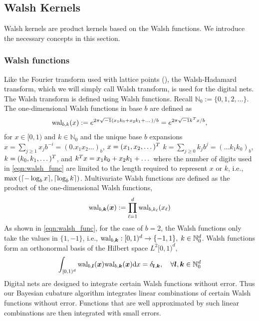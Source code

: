 \documentclass{svjour3}                     %
\let\vec\relax
\newcommand{\bm}[1]{\boldsymbol{#1}}
\newcommand{\dif}[1]{\text{d}{#1}}
\newcommand{\naturals}{\mathbb{N}}
\newcommand{\vk}{\bm{k}}
\newcommand{\vl}{\bm{l}}
\newcommand{\vx}{\bm{x}}
\newcommand{\dx}{\dif{{x}}}
\DeclarePairedDelimiter{\ceil}{\lceil}{\rceil}
\begin{document}
\subsection{Walsh Kernels}

Walsh kernels are product kernels based on the Walsh functions. We introduce the necessary concepts in this section.

\subsubsection{Walsh functions}
Like the Fourier transform used with lattice points (\cite{JagHic19a}), the Walsh-Hadamard transform, which we will simply call Walsh transform, is used for the digital nets. The Walsh transform is defined using Walsh functions. Recall $\naturals_0 := \lbrace 0,1,2,\dots \rbrace$.
The one-dimensional Walsh functions in base $b$ are defined as
\begin{align}
\label{eqn:walsh_func}
\textup{wal}_{b,k}(x) := e^{2\pi \sqrt{-1} (x_1 k_0 + x_2 k_1 + \dots)/b} 
=
e^{2\pi \sqrt{-1} {\vec{k}}^T{\vec{x}}/b},
\end{align}
for $x \in [0,1)$ and $k \in \naturals_0$ and the unique base $b$ expansions 
$x = \sum_{j \ge 1} x_j b^{-i} = (0.x_1 x_2 \dots)_b$, $\vec{x} =  (x_1,x_2,\dots )^T$
$k = \sum_{j \ge 0} k_j b^{j} = ( \dots k_1 k_0)_b$, $\vec{k} =  (k_0,k_1,\dots )^T$, and ${\vec{k}}^T{\vec{x}} = x_1 k_0 + x_2 k_1 + \dots$
where the number of digits used in \eqref{eqn:walsh_func} are limited to the length required to represent $x$ or $k$, i.e., $\max \left( {\ceil{ -\log_b{x}}, \ceil{\log_b{k}}  } \right)$.
Multivariate Walsh functions are defined as the product of the one-dimensional Walsh functions,
\begin{align*}
\textup{wal}_{b,\vk} (\vx) := \prod_{\ell=1}^d \textup{wal}_{b,k_\ell} (x_\ell
)
\end{align*}
As shown in \eqref{eqn:walsh_func}, for the case of $b=2$, the Walsh functions only take the values in $\{1, -1\}$, i.e., $\textup{wal}_{b,\vk} : [0,1)^d \to {\{-1, 1\}} , \; k \in \naturals_0^d$. Walsh functions form an orthonormal basis of the Hilbert space $L^2[0,1)^d$,
\begin{align*}
\int_{[0,1)^d}
\textup{wal}_{b,\vl} (\vx) \textup{wal}_{b,\vk}(\vx) \dx = \delta_{\vl, \vk}, \quad \forall \vl, \vk \in \naturals_0^d
\end{align*}
Digital nets are designed to integrate certain Walsh functions without error.
Thus our Bayesian cubature algorithm integrates linear combinations of %
certain Walsh functions without error. Functions that are well approximated by such linear combinations are then integrated with small errors.
\end{document}
